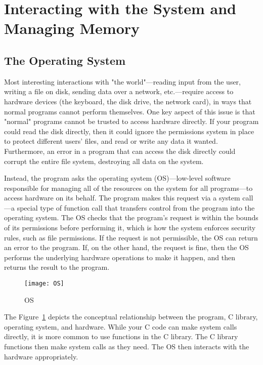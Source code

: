 \documentclass[11pt, a4paper]{article}
\begin{document}
\section{Interacting with the System and Managing Memory}%
\label{sec:interacting_with_the_system_and_managing_memory}


\subsection{The Operating System}%
\label{sub:the_operating_system}




Most interesting interactions with "the world"—reading input from the user, writing a file on disk, sending data over a network, etc.—require access to hardware devices (the keyboard, the disk drive, the network card), in ways that normal programs cannot perform themselves. One key aspect of this issue is that "normal" programs cannot be trusted to access hardware directly. If your program could read the disk directly, then it could ignore the permissions system in place to protect different users' files, and read or write any data it wanted. Furthermore, an error in a program that can access the disk directly could corrupt the entire file system, destroying all data on the system.

Instead, the program asks the operating system (OS)—low-level software responsible for managing all of the resources on the system for all programs—to access hardware on its behalf. The program makes this request via a system call—a special type of function call that transfers control from the program into the operating system. The OS checks that the program’s request is within the bounds of its permissions before performing it, which is how the system enforces security rules, such as file permissions. If the request is not permissible, the OS can return an error to the program. If, on the other hand, the request is fine, then the OS performs the underlying hardware operations to make it happen, and then returns the result to the program.



\begin{figure}[htpb]
  \centering
  \texttt{[image: OS]}
  \caption{OS}
  \label{fig:OS}
\end{figure}



The Figure~\ref{fig:OS} depicts the conceptual relationship between the program, C library, operating system, and hardware. While your C code can make system calls directly, it is more common to use functions in the C library. The C library functions then make system calls as they need. The OS then interacts with the hardware appropriately.
\end{document}
